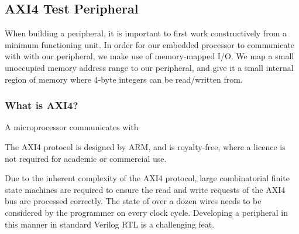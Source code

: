 \documentclass[a4paper,8pt]{report}
\begin{document}

\subsection{AXI4 Test Peripheral}
When building a peripheral, it is important to first work constructively from a
minimum functioning unit. In order for our embedded processor to communicate
with with our peripheral, we make use of memory-mapped I/O. We map a small
unoccupied memory address range to our peripheral, and give it a small internal
region of memory where 4-byte integers can be read/written from.

\subsubsection{What is AXI4?}
A microprocessor communicates with 

The AXI4 protocol is designed by ARM, and is royalty-free, where a licence is
not required for academic or commercial use.




Due to the inherent complexity of the AXI4 protocol, large combinatorial finite
state machines are required to ensure the read and write requests of the AXI4
bus are processed correctly.
The state of over a dozen wires needs to be considered by the programmer on
every clock cycle. Developing a peripheral in this manner in standard Verilog
RTL is a challenging feat.
\end{document}
